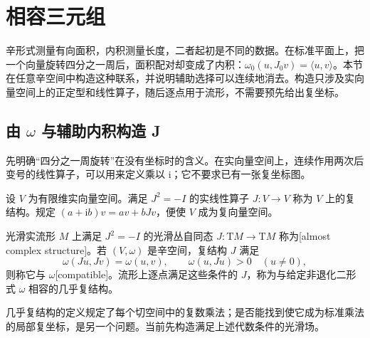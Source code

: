 
% 
% 

\section{相容三元组}
\label{g4:sec:0703}

辛形式测量有向面积，内积测量长度，二者起初是不同的数据。在标准平面上，把一个向量旋转四分之一周后，面积配对却变成了内积：\(\omega_0(u,J_0v)=\langle u,v\rangle\)。本节在任意辛空间中构造这种联系，并说明辅助选择可以连续地消去。构造只涉及实向量空间上的正定型和线性算子，随后逐点用于流形，不需要预先给出复坐标。

\subsection{\texorpdfstring{由 \(\omega\) 与辅助内积构造 J}{由 \GeometryPdfSmallOmega{} 与辅助内积构造 J}}
\label{g4:subsec:0703:01}

先明确“四分之一周旋转”在没有坐标时的含义。在实向量空间上，连续作用两次后变号的线性算子，可以用来定义乘以 \(\mathrm{i}\)；它不要求已有一张复坐标图。

\begin{definition}\label{g4:def:0703:almost-complex}
	设 \(V\) 为有限维实向量空间。满足 \(J^2=-I\) 的实线性算子 \(J:V\to V\) 称为 \(V\) 上的复结构。规定 \((a+\mathrm{i}b)v=av+bJv\)，便使 \(V\) 成为复向量空间。

	光滑实流形 \(M\) 上满足 \(J^2=-I\) 的光滑丛自同态 \(J:\mathrm{T}M\to\mathrm{T}M\) 称为[almost complex structure]。若 \((V,\omega)\) 是辛空间，复结构 \(J\) 满足
	\begin{equation}\label{g4:eq:0703:compatibility}
		\omega(Ju,Jv)=\omega(u,v),\qquad
		\omega(u,Ju)>0\quad(u\ne0),
	\end{equation}
	则称它与 \(\omega\)[compatible]。流形上逐点满足这些条件的 \(J\)，称为与给定非退化二形式 \(\omega\) 相容的几乎复结构。
\end{definition}

几乎复结构的定义规定了每个切空间中的复数乘法；是否能找到使它成为标准乘法的局部复坐标，是另一个问题。当前先构造满足上述代数条件的光滑场。

\ProseParagraphBreak

